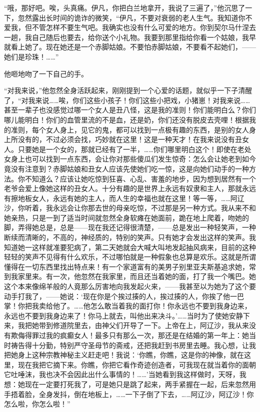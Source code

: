 \par “哦，那好吧。唉，头真痛。伊凡，你把白兰地拿开，我说了三遍了，”他沉思了一下，忽然露出长时间的诡诈的微笑，“伊凡，不要对衰弱的老人生气。我知道你不爱我，但不管怎样不要生气吧。我确实也没有什么可爱的地方。你到契尔马什涅去一趟，我自己随后也要去，给你送个小礼物。我要到那里指给你看一个姑娘，我早就看上她了。现在她还是一个赤脚姑娘。不要怕赤脚姑娘，不要看不起她们，——她们是珍珠！……”
\par 他咂地吻了一下自己的手。
\par “对我来说，”他忽然全身活跃起来，刚刚提到一个心爱的话题，就似乎一下子清醒了，“对我来说……唉，你们这些小孩子！你们这些小把戏，小猪崽！对我来说……甚至一辈子也没感觉过哪一个女人是丑八怪，这是我的准则！你们能明白么？你们哪儿能明白！你们的血管里流的不是血，还是奶，你们还没有脱皮去壳哩！根据我的准则，每个女人身上，见它的鬼，都可以找到一点极有趣的东西，是别的女人身上所没有的，不过必须会找，巧妙就在这里！这是一种天才！在我来说没有丑女人。只要她是一个女的，那就已经有了一半，……你们哪里明白这个！即使在老处女身上也可以找到一点东西，会让你对那些傻瓜们发生惊奇：怎么会让她老到如今竟没有注意到？赤脚姑娘和丑女人应该先使她们吃一惊，这是向她们动手的一种方法。你不知道么？应该让她吃惊到狂喜、心乱、害羞的地步，因为想到居然有一个老爷会爱上像她这样的丑女人。十分有趣的是世界上永远有奴隶和主人，那就永远有擦地板女人，永远有她的主人，而人生的幸福也就在这里！等一等，……阿辽沙，你听着，我永远会让你那去世的母亲吃惊，不过那是另一种方式。我从来不和她亲热，只是一到了适当时间就忽然全身软瘫在她面前，跪在地上爬着，吻她的脚，弄得她总是，总是——现在我还记得很清楚，——总是发出一种轻笑声，一种断续而清晰的，不高的，神经质的，特别的笑声。只有她才会发出这样的笑声。我知道她一这样就准要犯病了，第二天她就会大喊大叫地发起抽风病来，目前的这种轻轻的笑声不见得有什么欢乐，不过哪怕就是一种假象也总算是欢乐。这就是所谓懂得在一切东西里找出特点来！有一个家道富有的美男子别里亚夫斯基追求她，常到我家里来。有一次，他忽然在我家里，而且还当着她的面，打了我一个嘴巴。她这个本来像绵羊般的人竟那么厉害地向我发起火来，——我甚至以为她为了这个要动手打我了，——她说：‘现在你是个挨过揍的人，挨过揍的人，你挨了他一巴掌！你把我卖给他了。……他怎么敢当着我的面打你！你永远也不要到我身边来，永远也不要到我身边来了！你马上就去，叫他出来决斗。’……当时为了使她安静下来，我把她带到修道院里去，由神父们开导了一下。上帝在上，阿辽沙，我从来没有欺侮得罪过我的疯癫女人！最多只有那么一次，那还是在结婚的第一年上：她当时祷告得十分勤，特别严守圣母节的斋戒，还把我赶到书房里去睡。我心想，让我把她身上这种宗教神秘主义赶走吧！我说：‘你瞧，你瞧，这是你的神像，就在这里，现在我把它摘下来。你瞧，你把它看作奇迹创造者，可我现在就当着你的面朝它吐唾沫，我也决不会因此出什么事情的！……’当她看到我这样做时，天呀，我想：她现在一定要打死我了，可是她只是跳了起来，两手紧握在一起，后来忽然用手捂着脸，全身发抖，倒在地板上，……一下子倒了下去，……阿辽沙，阿辽沙！你怎么啦，你怎么啦！”
